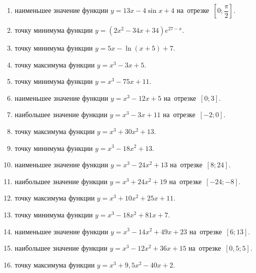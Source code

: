 \documentclass[a4paper,10pt]{article}
\begin{document}
\begin{enumerate}
\item {} наименьшее значение функции $y=13x-4\sin x +4$ на~отрезке~$\left[0;\dfrac{\pi }{2}\right]$.

\item {} точку минимума функции $y=\left(2x^2-34x+34\right){{e}^{27-x}}$.

\item {} точку минимума функции $y=5x-\ln \left(x+5\right)+7$.

\item {} точку максимума функции $y=x^3 -3x +5$.

\item {} точку минимума функции $y=x^3 -75x+11$.

\item {} наименьшее значение функции $y=x^3 -12x+5$ на~отрезке~$\left[0;3\right]$.

\item {} наибольшее значение функции $y=x^3 -3x+11$ на~отрезке~$\left[-2;0\right]$.

\item {} точку максимума функции $y=x^3 +30x^2+13$.

\item {} точку минимума функции $y=x^3 -18x^2+13$.

\item {} наименьшее значение функции $y=x^3 -24x^2+13$ на~отрезке~$\left[8;24\right]$.

\item {} наибольшее значение функции $y=x^3 +24x^2+19$ на~отрезке~$\left[-24;-8\right]$.

\item {} точку максимума функции $y=x^3 +10x^2+25x+11$.

\item {} точку минимума функции $y=x^3 -18x^2+81x+7$.

\item {} наименьшее значение функции $y=x^3 -14x^2+49x+23$ на~отрезке~$\left[6;13\right]$.

\item {} наибольшее значение функции $y=x^3 -12x^2+36x+15$ на~отрезке~$\left[0,5;5\right]$.

\item {} точку максимума функции $y=x^3 +9,5x^2-40x+2$.


\end{enumerate}
\end{document}
